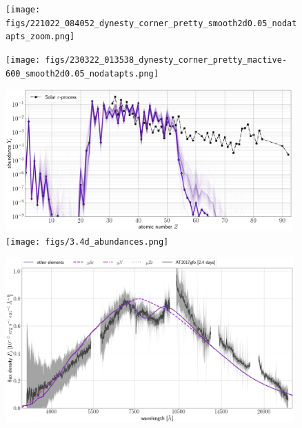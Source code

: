 \documentclass[twocolumn, twocolappendix]{aastex63}
\begin{document}
\begin{figure}[!ht]
    \texttt{[image: figs/221022\_084052\_dynesty\_corner\_pretty\_smooth2d0.05\_nodatapts\_zoom.png]}
    \label{fig:corner_single_2.4}
\end{figure}

\begin{figure}[!ht]
    \texttt{[image: figs/230322\_013538\_dynesty\_corner\_pretty\_mactive-600\_smooth2d0.05\_nodatapts.png]}
    \label{fig:corner_single_3.4}
\end{figure}


\begin{figure}[!ht]
    \includegraphics[width=0.98\textwidth]{figs/W18_abunds_sampleposterior_2.42d_Z1-92_Ye_0.306__vexp_0.172__s_17.3__solarL09B14_500samples.png}
    \texttt{[image: figs/3.4d\_abundances.png]}
    \label{fig:infer_abunds_single}
\end{figure}


\begin{figure}[!ht]
    \includegraphics[width=0.985\textwidth]{figs/230409_234104_leaveoneout_all_TARDIS_evals_label-interest.png}
    \label{fig:leave_out_single_2.4d}
\end{figure}
\end{document}
